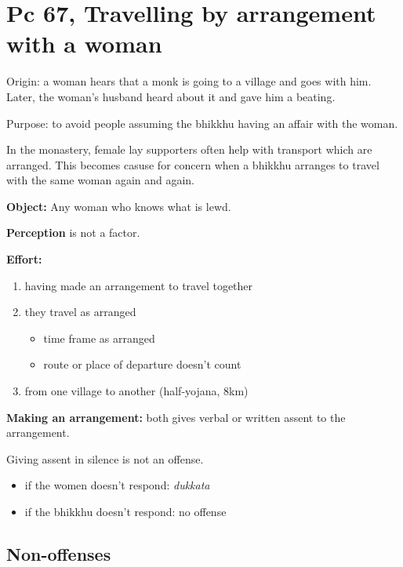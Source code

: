 \section{Pc 67, Travelling by arrangement with a woman}

Origin: a woman hears that a monk is going to a village and goes with
him. Later, the woman's husband heard about it and gave him a beating.

Purpose: to avoid people assuming the bhikkhu having an affair with the
woman.

In the monastery, female lay supporters often help with transport which
are arranged. This becomes casuse for concern when a bhikkhu arranges to
travel with the same woman again and again.

\textbf{Object:} Any woman who knows what is lewd.

\textbf{Perception} is not a factor.

\textbf{Effort:}

\begin{enumerate}
\def\labelenumi{\arabic{enumi}.}
\tightlist
\item
  having made an arrangement to travel together
\item
  they travel as arranged

  \begin{itemize}
  \tightlist
  \item
    time frame as arranged
  \item
    route or place of departure doesn't count
  \end{itemize}
\item
  from one village to another (half-yojana, 8km)
\end{enumerate}

\textbf{Making an arrangement:} both gives verbal or written assent to
the arrangement.

Giving assent in silence is not an offense.

\begin{itemize}
\tightlist
\item
  if the women doesn't respond: \emph{dukkata}
\item
  if the bhikkhu doesn't respond: no offense
\end{itemize}

\subsection{Non-offenses}


